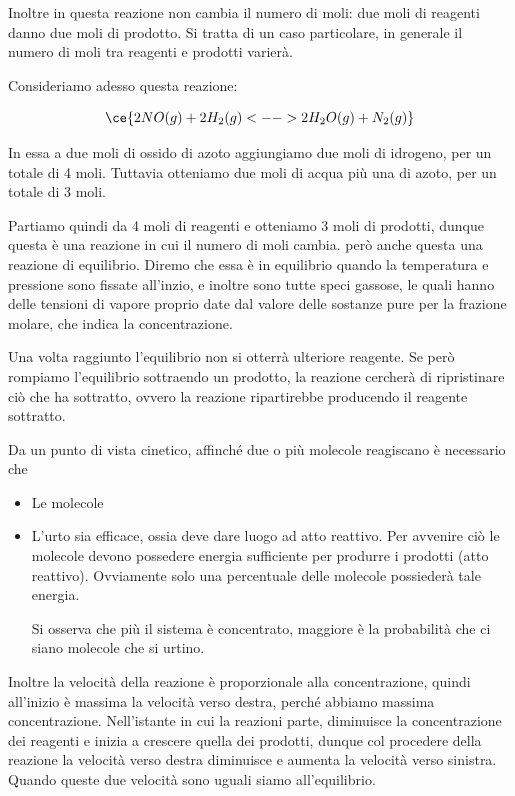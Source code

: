 Inoltre in questa reazione non cambia il numero di moli: due moli di reagenti danno due moli di prodotto. Si tratta di un caso particolare, in generale il numero di moli tra reagenti e prodotti varierà.

\vspace{0.2cm}Consideriamo adesso questa reazione:

$$\ce{2NO(g) + 2H_2(g) <--> 2H_2O(g) + N_2(g)}$$

In essa a due moli di ossido di azoto aggiungiamo due moli di idrogeno, per un totale di 4 moli. Tuttavia otteniamo due moli di acqua più una di azoto, per un totale di 3 moli.

Partiamo quindi da 4 moli di reagenti e otteniamo 3 moli di prodotti, dunque questa è una reazione in cui il numero di moli cambia. \E però anche questa una reazione di equilibrio. Diremo che essa è in equilibrio quando la temperatura e pressione sono fissate all'inzio, e inoltre sono tutte speci gassose, le quali hanno delle tensioni di vapore proprio date dal valore delle sostanze pure per la frazione molare, che indica la concentrazione.

Una volta raggiunto l'equilibrio non si otterrà ulteriore reagente. Se però rompiamo l'equilibrio sottraendo un prodotto, la reazione cercherà di ripristinare ciò che ha sottratto, ovvero la reazione ripartirebbe producendo il reagente sottratto.

\vspace{0.2cm}Da un punto di vista cinetico, affinché due o più molecole reagiscano è necessario che

\begin{itemize}
    \item Le molecole
    \item L'urto sia efficace, ossia deve dare luogo ad atto reattivo. Per avvenire ciò le molecole devono possedere energia sufficiente per produrre i prodotti (atto reattivo). Ovviamente solo una percentuale delle molecole possiederà tale energia.

    Si osserva che più il sistema è concentrato, maggiore è la probabilità che ci siano molecole che si urtino.
\end{itemize}

Inoltre la velocità della reazione è proporzionale alla concentrazione, quindi all'inizio è massima la velocità verso destra, perché abbiamo massima concentrazione. Nell'istante in cui la reazioni parte, diminuisce la concentrazione dei reagenti e inizia a crescere quella dei prodotti, dunque col procedere della reazione la velocità verso destra diminuisce e aumenta la velocità verso sinistra. Quando queste due velocità sono uguali siamo all'equilibrio.
